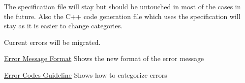 The specification file will stay but should be untouched in most of the cases in the future. Also the C++ code generation file which uses the specification will stay as it is easier to change categories.

Current errors will be migrated.


\begin{DoxyItemize}
\item \hyperlink{doc_decisions_error_message_format_md}{Error Message Format} Shows the new format of the error message
\item \hyperlink{doc_dev_error-categorization_md}{Error Codes Guideline} Shows how to categorize errors
\end{DoxyItemize}